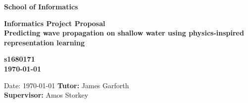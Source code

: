 \documentclass[a4paper,11pt]{article}
\newcommand{\examnumber}{s1680171}
\newcommand{\field}{Predicting wave propagation on shallow water using physics-inspired representation learning}
\newcommand{\tutor}{James Garforth}
\newcommand{\supervisor}{Amos Storkey}
\begin{document}
\begin{minipage}[b]{110mm}
        {\Huge\bf School of Informatics
        \vspace*{17mm}}
\end{minipage}
\hfill
\begin{minipage}[t]{40mm}               
\end{minipage}
\par\noindent
\vspace*{2cm}
\begin{center}
        \Large\bf Informatics Project Proposal \\
        \vspace*{1cm}
        \Large\bf \field
\end{center}
\vspace*{1.5cm}
\begin{center}
        \bf \examnumber\\
        \monthyeardate\today
\end{center}
\vspace*{4mm}

%
%                       
\begin{abstract}
  Wave propagation is an important problem from both a theoretical and practical point of view because it is key to many fields of science and engineering. The current numerical solvers are slow and cannot be used in iterative design work-flows. In recent years various deep learning methods have been used to produce fast approximations but a systematic assessment is lacking as of now. This work intends to fill this gap by comparing generic frame prediction architectures to methods specialized on fluid flow in terms of accuracy, speed and generalization to other physical systems. Furthermore, we propose a new architecture that stands between generic and specialized methods, inspired by a \textcolor{red}{Hamiltonian} formulation for conservative systems aiming to provide further insights on how learning algorithms encapsulate the dynamics in physical systems. 
\end{abstract}

\vspace*{0cm}
\vspace*{2cm}
Date: \today
\vfill
{\bf Tutor:} \tutor\\
{\bf Supervisor:} \supervisor
\newpage

\setcounter{page}{1}                            %
\footruleheight{1pt}
\headruleheight{1pt}
\rhead{- \thepage}
\cfoot{}
%
\tableofcontents                                %
\end{document}
